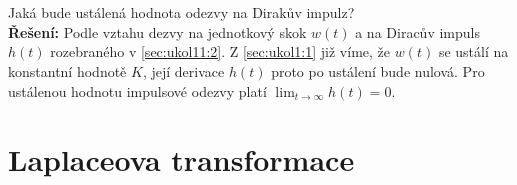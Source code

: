 \documentclass[twoside]{article}
\begin{document}
\subsection{~}
\label{sec:ukol1:3}
Jaká bude ustálená hodnota odezvy na Dirakův impulz? \\
\textbf{Řešení:} Podle vztahu dezvy na jednotkový skok $w(t)$ a na Diracův impuls $h(t)$ rozebraného v \ref{sec:ukol11:2}. Z \ref{sec:ukol1:1} již víme, že $w(t)$ se ustálí
na konstantní hodnotě $K$, její derivace $h(t)$ proto po ustálení bude nulová. Pro ustálenou hodnotu impulsové odezvy platí $\lim_{t \to \infty} h(t) = 0$.

\section{Laplaceova transformace}
\label{sec:ukol2}
\end{document}
